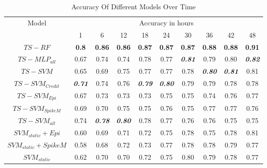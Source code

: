 %
%

\begin{table}[]
\centering
\begin{tabular}{|c|ccccccccc|}
\hline
\multicolumn{1}{|c|}{\multirow{2}{*}{Model}} & \multicolumn{9}{c|}{Accuracy in hours}                     \\ \cline{2-10} 
\multicolumn{1}{|l|}{}& 1 & 6 &12& 18 & 24 & 30 & 36  & 42 & \multicolumn{1}{c|}{48} \\\hline
 $TS-RF$  & \textbf{0.8} &  \textbf{0.86} &  \textbf{0.86} &\textbf{0.87} & \textbf{0.87}& \textbf{0.87} &\textbf{0.88}&\textbf{0.88}&\textbf{0.91 }\\
$TS-MLP_{all}$ &0.67& 0.74  & 0.74 & 0.78  &   0.77   &   \textit{\textbf{0.81}}&0.79 &0.80& \textit{\textbf{0.82}} \\

$TS-SVM$ \cite{ma2015detect}&0.65  &0.69 & 0.75& 0.77 &  0.77   &0.78 & \textit{\textbf{0.80}}& \textit{\textbf{0.81} }& 0.81  \\
$TS-SVM_{Credit}$& \textit{\textbf{0.71}} & 0.74  & 0.76  & \textit{\textbf{0.79} }&   \textit{\textbf{0.80}} & 0.79  &0.79 &0.78 &0.78\\

$TS-SVM_{Epi}$&0.67 & 0.73 & 0.73  & 0.73 &  0.75 &0.75  &0.74 &0.76 & 0.77\\

$TS-SVM_{SpikeM}$&0.69 & 0.70 & 0.75  & 0.75 &  0.76 &0.75 &0.77 &0.77  & 0.76\\
$TS-SVM_{all}$ &0.74 & \textit{ \textbf{0.78}}  &  \textit{\textbf{0.80}} & 0.78 &   0.77 &   0.76&   0.76&   0.75 & 0.75  \\

$SVM_{static}+Epi$ \cite{jin2013epidemiological} &0.60& 0.69  & 0.71&0.72   &  0.75 &0.78& 0.75&0.78&0.81 \\   

$SVM_{static}+SpikeM$ \cite{kwon2013prominent} &0.58& 0.68  & 0.72&0.73   &  0.77 &0.78& 0.78&0.79&0.77 \\   

$SVM_{static}$ \cite{yang2012automatic} &0.62& 0.70  & 0.70&0.72   &  0.75 &0.80& 0.79&0.78&0.77 \\   



 \bottomrule           
\end{tabular}
 \caption{Accuracy Of Different Models Over Time}
 \label{tab:time_result}
\end{table}
